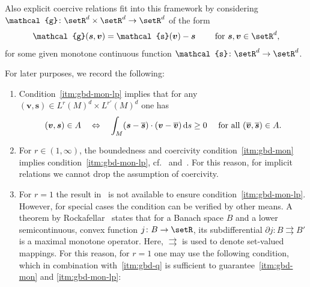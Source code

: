 \documentclass[reqno,a4paper]{amsart}
\def\vec#1{\boldsymbol{#1}}
\def\d{{\rm d}}
\def\ds{\,\d s}
\def\toto{\rightrightarrows}
\def\bs{\vec{s}}
\def\bv{\vec{v}}
\def\gbd{\vec{\mathcal{g}}}
\def\Srel{\vec{\mathcal{s}}}
\begin{document}
	\noindent Also explicit coercive relations fit into this framework by considering $\gbd \colon \setR^d \times \setR^d \to \setR^d$ of the form 
	\begin{align}\label{eq:gbd-expl}
		\gbd(\bs,\bv) = \Srel(\bv) - \bs \qquad \text{ for } \bs, \bv \in \setR^d,
	\end{align}
	for some given monotone continuous function $\Srel \colon \setR^d \to \setR^d$.
	
	\begin{remark} For later purposes, we record the following:
		\begin{enumerate}[label = (\alph*)] \label{rmk:max-mon}
			\item 
			Condition~\ref{itm:gbd-mon-lp} implies that for any $(\bv,\bs) \in  L^{r}(M)^d\times L^{r'}(M)^d$ one has 
			\begin{align*}
				(\bv,\bs) \in A \quad \Leftrightarrow \quad 
				\int_{M} (\bs - \overline{\bs}) \cdot (\bv - \overline{\bv}) \ds  
				\geq 0 \quad \text{ for all } (\overline{\bv},\overline{\bs}) \in {A}. 
			\end{align*} 
			\item \label{itm:rmk-A4} 
			For $r \in (1,\infty)$, the boundedness and coercivity condition~\ref{itm:gbd-mon} implies condition~\ref{itm:gbd-mon-lp}, cf.~\cite[Thm.~(3.18)~(e)]{Browder1976} and~\cite[Thm.~1.9]{ChiadoPiatDalMasoDefranceschi1990}. 
			For this reason, for implicit relations we cannot drop the assumption of coercivity. 
			
			\item \label{itm:max-mon-r1} 
			For $r = 1$ the result in~\cite{ChiadoPiatDalMasoDefranceschi1990} is not available to ensure condition~\ref{itm:gbd-mon-lp}. 
			However, for special cases the condition can be verified by other means. 
			A theorem by Rockafellar~\cite[Thm.~A]{Rockafellar1970} states that for a Banach space $B$ and a lower semicontinuous, convex function $j \colon B \to \setR$, its subdifferential $\partial j \colon B \toto B'$ is a maximal monotone operator. 
			Here, $\toto$ is used to denote set-valued mappings.   	
			For this reason, for $r = 1$ one may use the following condition, which in combination with~\ref{itm:gbd-q} is sufficient to guarantee~\ref{itm:gbd-mon} and \ref{itm:gbd-mon-lp}: 
			\smallskip  
			

\end{enumerate}
\end{remark}
\end{document}
